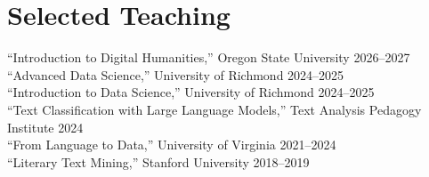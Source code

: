 \documentclass[12pt, letterpaper]{article}
\begin{document}
\section{Selected Teaching}
``Introduction to Digital Humanities,'' Oregon State University \hfill 2026--2027 \\
``Advanced Data Science,'' University of Richmond \hfill 2024--2025 \\
``Introduction to Data Science,'' University of Richmond \hfill 2024--2025 \\
``Text Classification with Large Language Models,'' Text Analysis Pedagogy Institute \hfill 2024 \\
``From Language to Data,'' University of Virginia \hfill 2021--2024 \\
``Literary Text Mining,'' Stanford University \hfill 2018--2019
\end{document}
